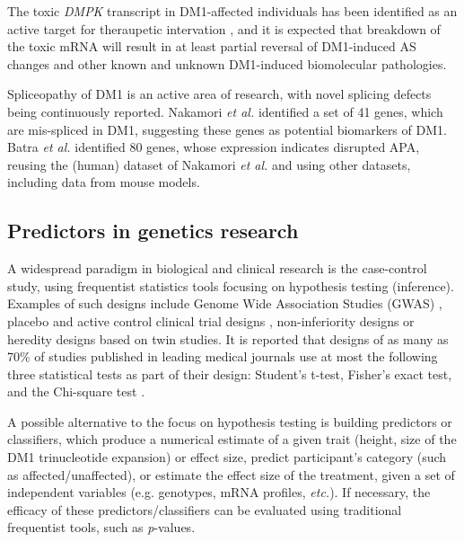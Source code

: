 \documentclass[10pt,letterpaper]{article}
\begin{document}
The toxic {\it DMPK} transcript in DM1-affected individuals has been identified as an active target for theraupetic intervation \cite{Pandey2015}, and it is expected that breakdown of the toxic mRNA will result in at least partial reversal of DM1-induced AS changes and other known and unknown DM1-induced biomolecular pathologies.

Spliceopathy of DM1 is an active area of research, with novel splicing defects being continuously reported. Nakamori {\it et al.} \cite{Nakamori2013} identified a set of 41 genes, which are mis-spliced in DM1, suggesting these genes as potential biomarkers of DM1. Batra {\it et al.} \cite{Batra2014} identified 80 genes, whose expression indicates disrupted APA, reusing the (human) dataset of Nakamori {\it et al.} and using other datasets, including data from mouse models.

\subsection*{Predictors in genetics research}

A widespread paradigm in biological and clinical research is the case-control study, using frequentist statistics tools focusing on hypothesis testing (inference). Examples of such designs include Genome Wide Association Studies (GWAS) \cite{Bush2012}, placebo and active control clinical trial designs \cite{Brody2016}, non-inferiority designs \cite{DAgostino2002} or heredity designs based on twin studies. It is reported that designs of as many as 70\%  of studies published in leading medical journals use at most the following three statistical tests as part of their design: Student's t-test, Fisher's exact test, and the Chi-square test \cite{Prel2010}.

A possible alternative to the focus on hypothesis testing is building predictors or classifiers, which produce a numerical estimate of a given trait (height, size of the DM1 trinucleotide expansion) or effect size, predict participant's category (such as affected/unaffected), or estimate the effect size of the treatment, given a set of independent variables (e.g. genotypes, mRNA profiles, {\it etc.}). If necessary, the efficacy of these predictors/classifiers can be evaluated using traditional frequentist tools, such as {\it p}-values.
\end{document}
